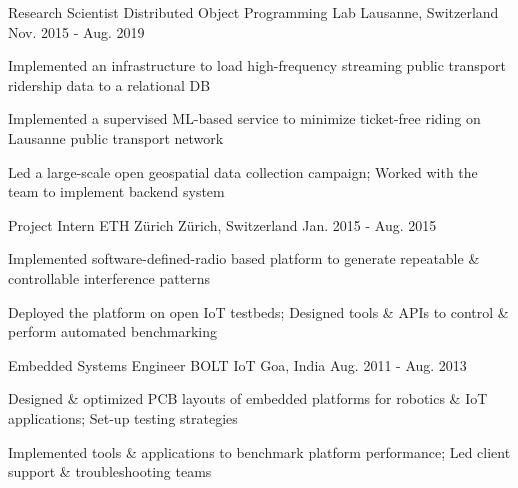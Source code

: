 \begin{cventries}
  \cventry
    {Research Scientist} %
    {Distributed Object Programming Lab} %
    {Lausanne, Switzerland} %
    {Nov. 2015 - Aug. 2019} %
    {
      \begin{cvitems} %
      	\item {Implemented an infrastructure to load high-frequency streaming public transport ridership data to a relational DB}
      	\item {Implemented a supervised ML-based service to minimize ticket-free riding on Lausanne public transport network}
        \item {Led a large-scale open geospatial data collection campaign; Worked with the team to implement backend system}
      \end{cvitems}
    }


  \cventry
    {Project Intern} %
    {ETH Zürich} %
    {Zürich, Switzerland} %
    {Jan. 2015 - Aug. 2015} %
    {
      \begin{cvitems} %
      	\item {Implemented software-defined-radio based platform to generate repeatable \& controllable interference patterns}
        \item {Deployed the platform on open IoT testbeds; Designed tools \& APIs to control \& perform automated benchmarking}
      \end{cvitems}
    }

  \cventry
    {Embedded Systems Engineer} %
    {BOLT IoT} %
    {Goa, India} %
    {Aug. 2011 - Aug. 2013} %
    {
      \begin{cvitems} %
      	\item {Designed \& optimized PCB layouts of embedded platforms for robotics \& IoT applications; Set-up testing strategies}
        \item {Implemented tools \& applications to benchmark platform performance; Led client support \& troubleshooting teams}
      \end{cvitems}
    }
    
    \vspace{-0.4cm}

\end{cventries}
